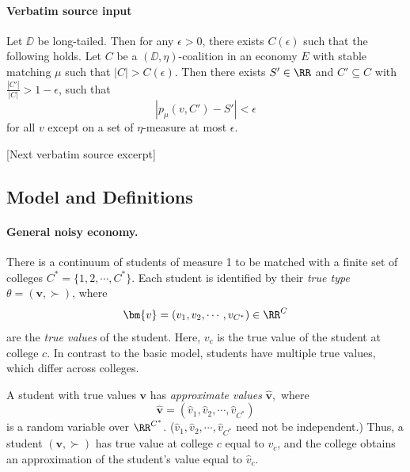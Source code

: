 \documentclass[10pt]{article}
\begin{document}
\paragraph{Verbatim source input}
\begin{ReviewVerbatim}
\begin{theorem}\label{thm:amplifying-extended}
    Let $\DD$ be long-tailed. Then for any $\epsilon > 0$, there exists $C(\epsilon)$ such that the following holds.
    Let $C$ be a $(\DD, \eta)$-coalition in an economy $E$ with stable matching $\mu$ such that $|C|>C(\epsilon)$. Then there exists $S'\in \RR$ and $C'\subseteq C$ with $\frac{|C'|}{|C|} > 1 - \epsilon$, such that
    \begin{equation}
        |p_\mu(v, C')-S'| < \epsilon
    \end{equation}
    for all $v$ except on a set of $\eta$-measure at most $\epsilon$.
\end{theorem}

[Next verbatim source excerpt]

\subsection{Model and Definitions}

\paragraph{General noisy economy.}
There is a continuum of students of measure 1 to be matched with a finite set of colleges $C^* = \{1, 2, \cdots, C^*\}.$ Each student is identified by their \textit{true type} $\theta = (\bm{v}, \succ)$, where
\begin{equation}
    \bm{v} = (v_1, v_2, \cdots, v_{C^*}) \in \RR^C
\end{equation}
are the \textit{true values} of the student. Here, $v_c$ is the true value of the student at college $c$. In contrast to the basic model, students have multiple true values, which differ across colleges.

A student with true values $\bm{v}$ has \textit{approximate values} $\hat{\bm{v}},$ where
\begin{equation}
    \hat{\bm{v}} = (\hat{v}_1, \hat{v}_2, \cdots, \hat{v}_{C^*})
\end{equation}
is a random variable over $\RR^{C^*}$. ($\hat{v}_1, \hat{v}_2, \cdots, \hat{v}_{C^*}$ need not be independent.) Thus, a student $(\bm{v},\succ)$ has true value at college $c$ equal to $v_c$, and the college obtains an approximation of the student's value equal to $\hat{v}_c.$


\end{ReviewVerbatim}
\end{document}
